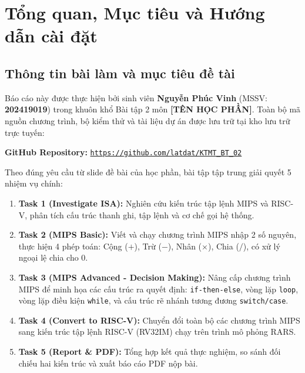 \documentclass[12pt,a4paper]{article}
\newcommand{\StudentName}{Nguyễn Phúc Vinh}
\newcommand{\StudentID}{202419019}
\newcommand{\CourseName}{[TÊN HỌC PHẦN]}   %
\newcommand{\GithubRepo}{https://github.com/latdat/KTMT_BT_02}
\begin{document}
\newpage
{}
\tableofcontents
\newpage
{}
\setcounter{page}{1}

\section{Tổng quan, Mục tiêu và Hướng dẫn cài đặt}

\subsection{Thông tin bài làm và mục tiêu đề tài}
Báo cáo này được thực hiện bởi sinh viên \textbf{\StudentName} (MSSV: \textbf{\StudentID}) trong khuôn khổ Bài tập 2 môn \textbf{\CourseName}. Toàn bộ mã nguồn chương trình, bộ kiểm thử và tài liệu dự án được lưu trữ tại kho lưu trữ trực tuyến:
\begin{center}
    \textbf{GitHub Repository:} \href{\GithubRepo}{\texttt{\GithubRepo}}
\end{center}

Theo đúng yêu cầu từ slide đề bài của học phần, bài tập tập trung giải quyết 5 nhiệm vụ chính:
\begin{enumerate}
    \item \textbf{Task 1 (Investigate ISA):} Nghiên cứu kiến trúc tập lệnh MIPS và RISC-V, phân tích cấu trúc thanh ghi, tập lệnh và cơ chế gọi hệ thống.
    \item \textbf{Task 2 (MIPS Basic):} Viết và chạy chương trình MIPS nhập 2 số nguyên, thực hiện 4 phép toán: Cộng ($+$), Trừ ($-$), Nhân ($\times$), Chia ($/$), có xử lý ngoại lệ chia cho 0.
    \item \textbf{Task 3 (MIPS Advanced - Decision Making):} Nâng cấp chương trình MIPS để minh họa các cấu trúc ra quyết định: \texttt{if-then-else}, vòng lặp \texttt{loop}, vòng lặp điều kiện \texttt{while}, và cấu trúc rẽ nhánh tương đương \texttt{switch/case}.
    \item \textbf{Task 4 (Convert to RISC-V):} Chuyển đổi toàn bộ các chương trình MIPS sang kiến trúc tập lệnh RISC-V (RV32IM) chạy trên trình mô phỏng RARS.
    \item \textbf{Task 5 (Report \& PDF):} Tổng hợp kết quả thực nghiệm, so sánh đối chiếu hai kiến trúc và xuất báo cáo PDF nộp bài.
\end{enumerate}
\end{document}
